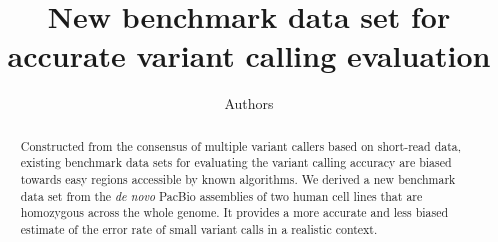 \documentclass{bioinfo}
\begin{document}

\title[Evaluating small variant calling]{New benchmark data set for accurate variant calling evaluation}

\author[Li et al]{Authors}

\address{}

\maketitle

\begin{abstract}

Constructed from the consensus of multiple variant callers based on short-read
data, existing benchmark data sets for evaluating the variant calling accuracy
are biased towards easy regions accessible by known algorithms.  We derived a
new benchmark data set from the \emph{de novo} PacBio assemblies of two human
cell lines that are homozygous across the whole genome. It provides a more
accurate and less biased estimate of the error rate of small variant calls in a
realistic context.

\end{abstract}
\end{document}
